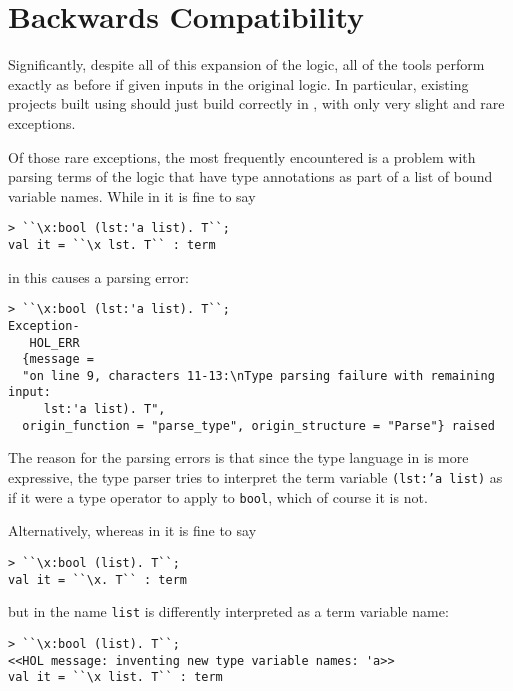 
%
\section{Backwards Compatibility}
%

Significantly,
despite all of this
expansion of the logic, all of the tools perform exactly as before if given
inputs in the original \HOL{} logic.
In particular, existing projects built using \HOL{} should just build
correctly in \HOLW, with only very slight and rare exceptions.

Of those rare exceptions, the most frequently encountered is a problem
with parsing terms of the logic that have type annotations as part of a list
of bound variable names.  While in \HOL{} it is fine to say
\begin{session}
\begin{verbatim}
> ``\x:bool (lst:'a list). T``;
val it = ``\x lst. T`` : term
\end{verbatim}
\end{session}
%
in \HOLW{} this causes a parsing error:
\begin{session}
\begin{verbatim}
> ``\x:bool (lst:'a list). T``;
Exception-
   HOL_ERR
  {message =
  "on line 9, characters 11-13:\nType parsing failure with remaining input:
     lst:'a list). T",
  origin_function = "parse_type", origin_structure = "Parse"} raised
\end{verbatim}
\end{session}

The reason for the parsing errors is that since the type language in \HOLW{}
is more expressive, the type parser tries to interpret the term variable
\texttt{(lst:'a list)} as if it were a type operator
to apply to \texttt{bool},
which of course it is not.

Alternatively, whereas in \HOLW{} it is fine to say
\begin{session}
\begin{verbatim}
> ``\x:bool (list). T``;
val it = ``\x. T`` : term
\end{verbatim}
\end{session}
%
but in \HOL{} the name \texttt{list} is differently interpreted as a
term variable name:
\begin{session}
\begin{verbatim}
> ``\x:bool (list). T``;
<<HOL message: inventing new type variable names: 'a>>
val it = ``\x list. T`` : term
\end{verbatim}
\end{session}

